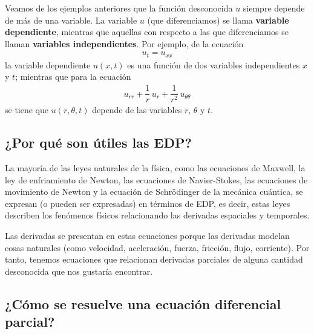 Veamos de los ejemplos anteriores que la función desconocida $u$ siempre depende de más de una variable. La variable $u$ (que diferenciamos) se llama \textbf{variable dependiente}, mientras que aquellas con respecto a las que diferenciamos se llaman \textbf{variables independientes}. Por ejemplo, de la ecuación
\begin{align*}
u_{t} = u_{xx}
\end{align*}
la variable dependiente $u(x, t)$ es una función de dos variables independientes $x$ y $t$; mientras que para la ecuación
\begin{align*}
u_{rr} + \dfrac{1}{r} \, u_{r} + \dfrac{1}{r^{2}} \, u_{\theta \theta}
\end{align*}
se tiene que $u(r, \theta, t)$ depende de las variables $r$, $\theta$ y $t$.
\subsection*{¿Por qué son útiles las EDP?}

La mayoría de las leyes naturales de la física, como las ecuaciones de Maxwell, la ley de enfriamiento de Newton, las ecuaciones de Navier-Stokes, las ecuaciones de movimiento de Newton y la ecuación de Schrödinger de la mecánica cuántica, se expresan (o pueden ser expresadas) en términos de EDP, es decir, estas leyes describen los fenómenos físicos relacionando las derivadas espaciales y temporales.
\par
Las derivadas se presentan en estas ecuaciones porque las derivadas modelan cosas naturales (como velocidad, aceleración, fuerza, fricción, flujo, corriente). Por tanto, tenemos ecuaciones que relacionan derivadas parciales de alguna cantidad desconocida que nos gustaría encontrar.

\subsection{¿Cómo se resuelve una ecuación diferencial parcial?}


